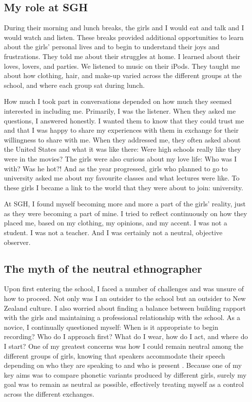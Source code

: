 \subsection{My role at SGH}

During their morning and lunch breaks, the girls and I would eat and talk and I would watch and listen. These breaks provided additional opportunities to learn about the girls' personal lives and to begin to understand their joys and frustrations. They told me about their struggles at home. I learned about their loves, lovers, and parties. We listened to music on their iPods. They taught me about how clothing, hair, and make-up varied across the different groups at the school, and where each group sat during lunch.

How much I took part in conversations depended on how much they seemed interested in including me. Primarily, I was the listener. When they asked me questions, I answered honestly. I wanted them to know that they could trust me and that I was happy to share my experiences with them in exchange for their willingness to share with me. When they addressed me, they often asked about the United States and what it was like there: Were high schools really like they were in the movies? The girls were also curious about my love life: Who was I with?  Was he hot?!  And as the year progressed, girls who planned to go to university asked me about my favourite classes and what lectures were like. To these girls I became a link to the world that they were about to join: university.

At SGH, I found myself becoming more and more a part of the girls' reality, just as they were becoming a part of mine. I tried to reflect continuously on how they placed me, based on my clothing, my opinions, and my accent. I was not a student. I was not a teacher. And I was certainly not a neutral, objective observer. 


\subsection{The myth of the neutral ethnographer}

Upon first entering the school, I faced a number of challenges and was unsure of how to proceed. Not only was I an outsider to the school but an outsider to New Zealand culture. I also worried about finding a balance between building rapport with the girls and maintaining a professional relationship with the school. As a novice, I continually questioned myself: When is it appropriate to begin recording?  Who do I approach first?  What do I wear, how do I act, and where do I start?  One of my greatest concerns was how I could remain neutral among the different groups of girls, knowing that speakers accommodate their speech depending on who they are speaking to and who is present \citep{gilespowesland1975,bell1984,gilesetal1991}. Because one of my key aims was to compare phonetic variants produced by different girls, surely my goal was to remain as neutral as possible, effectively treating myself as a control across the different exchanges. 

